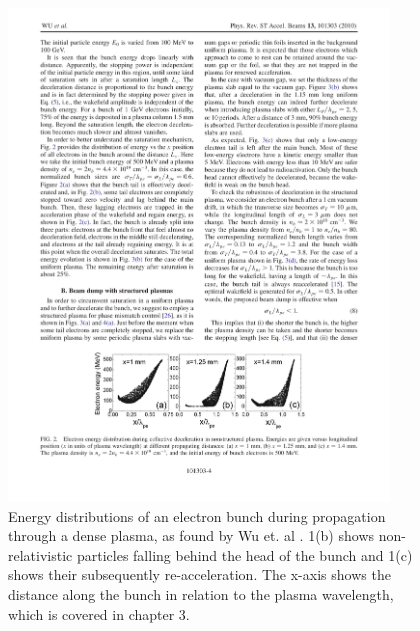 \begin{figure}
\centering
\includegraphics[width=0.9\textwidth]{Wu_energy_uniform.pdf}
\caption{\small{Energy distributions of an electron bunch during propagation through a dense plasma, as found by Wu et. al \cite{Wu2010}. 1(b) shows non-relativistic particles falling behind the head of the bunch and 1(c) shows their subsequently re-acceleration. The x-axis shows the distance along the bunch in relation to the plasma wavelength, which is covered in chapter 3.}}
\label{Wu}
\end{figure}
